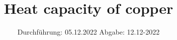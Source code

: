 

\subject{V 47}
\title{Heat capacity of copper}
\date{%
  Durchführung: 05.12.2022
  \hspace{3em}
  Abgabe: 12.12-2022
}



\maketitle
\thispagestyle{empty}
\tableofcontents
\newpage








\printbibliography{}


